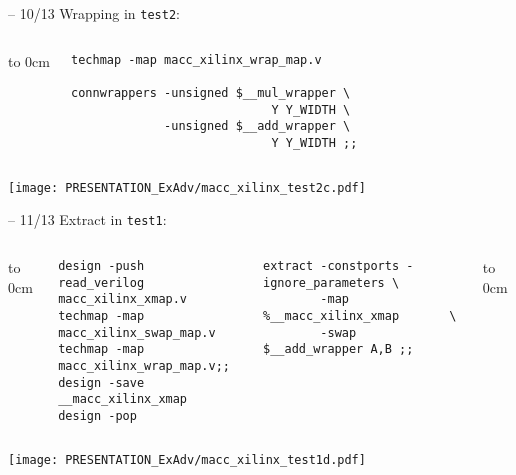 \begin{frame}[t, fragile]{\subsubsecname{} -- 10/13}
Wrapping in {\tt test2}:
\begin{columns}
\column[t]{5cm}
\vbox to 0cm{\vss}
\column[t]{6cm}
\begin{lstlisting}[linewidth=5cm, basicstyle=\ttfamily\fontsize{8pt}{10pt}\selectfont, language=ys]
techmap -map macc_xilinx_wrap_map.v

connwrappers -unsigned $__mul_wrapper \
                            Y Y_WIDTH \
             -unsigned $__add_wrapper \
                            Y Y_WIDTH ;;
\end{lstlisting}
\end{columns}

\vskip1cm
\hfil\texttt{[image: PRESENTATION\_ExAdv/macc\_xilinx\_test2c.pdf]}
\end{frame}

\begin{frame}[t, fragile]{\subsubsecname{} -- 11/13}
Extract in {\tt test1}:
\begin{columns}
\column[t]{4.5cm}
\vbox to 0cm{
\begin{lstlisting}[linewidth=5cm, basicstyle=\ttfamily\fontsize{8pt}{10pt}\selectfont, language=ys]
design -push
read_verilog macc_xilinx_xmap.v
techmap -map macc_xilinx_swap_map.v
techmap -map macc_xilinx_wrap_map.v;;
design -save __macc_xilinx_xmap
design -pop
\end{lstlisting}
\vss}
\column[t]{5.5cm}
\vskip-1cm
\begin{lstlisting}[linewidth=5.5cm, basicstyle=\ttfamily\fontsize{8pt}{10pt}\selectfont, language=ys]
extract -constports -ignore_parameters \
        -map %__macc_xilinx_xmap       \
        -swap $__add_wrapper A,B ;;
\end{lstlisting}
\vbox to 0cm{\vss}
\end{columns}

\vskip2cm
\hfil\texttt{[image: PRESENTATION\_ExAdv/macc\_xilinx\_test1d.pdf]}
\end{frame}

